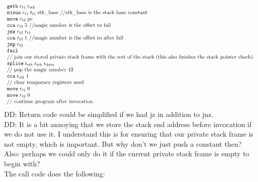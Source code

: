 \documentclass[a3paper]{article}
\newcommand\dominique[1]{{\color{purple} \sf \footnotesize {DD: #1}}\\}
\newcommand{\targetcolor}[1]{\color{black}}
\newcommand{\trg}[1]{{\targetcolor{} #1}}
\newcommand{\zinstr}[1]{\texttt{#1}}
\newcommand{\oneinstr}[2]{
  \ifthenelse{\equal{#2}{}}
  {\zinstr{#1}}
  {\zinstr{#1} \; #2}
}
\newcommand{\twoinstr}[3]{
  \ifthenelse{\equal{#2#3}{}}
  {\zinstr{#1}}
  {\zinstr{#1} \; #2 \; #3}
}
\newcommand{\threeinstr}[4]{
  \ifthenelse{\equal{#2#3#4}{}}
  {\zinstr{#1}}
  {\zinstr{#1} \; #2 \; #3 \; #4}
}
\newcommand{\tfail}{\zinstr{\trg{fail}}}
\newcommand{\tjmp}[1]{\oneinstr{\trg{jmp}}{#1}}
\newcommand{\tjnz}[2]{\twoinstr{\trg{jnz}}{#1}{#2}}
\newcommand{\tgetb}[2]{\twoinstr{\trg{getb}}{#1}{#2}}
\newcommand{\tmove}[2]{\twoinstr{\trg{move}}{#1}{#2}}
\newcommand{\tcca}[2]{\twoinstr{\trg{cca}}{#1}{#2}}
\newcommand{\tsplice}[3]{\threeinstr{\trg{splice}}{#1}{#2}{#3}}
\newcommand{\tminus}[3]{\threeinstr{\trg{minus}}{#1}{#2}{#3}}
\newcommand{\constant}[1]{\mathrm{#1}}
\newcommand{\stkb}{\constant{stk\_base}}
\newcommand{\pcreg}{\mathrm{pc}}
\newcommand{\rstk}{\mathrm{r}_\mathrm{stk}}
\newcommand{\rdata}{\mathrm{r}_\mathrm{data}}
\begin{document}
\[\begin{array}{l}
    \tgetb{r_{t1}}{\rstk}\\
    \tminus{r_{t1}}{t_{t1}}{\stkb} \text{ //$\stkb$ is the stack base constant} \\
    \tmove{r_{t2}}{\pcreg}\\
    \tcca{r_{t2}}{5} \text{ //magic number is the offset to fail} \\
    \tjnz{r_{t2}}{r_{t1}} \\
    \tcca{r_{t2}}{1} \text{ //magic number is the offset to after fail} \\
    \tjmp{r_{t2}} \\
    \tfail \\
    \text{// join our stored private stack frame with the rest of the stack (this also finishes the stack pointer check).}\\
    \tsplice{\rstk}{\rstk}{\rdata} \\
    \text{// pop the magic number 42}\\
    \tcca{\rstk}{1}\\
    \text{// clear temporary registers used}\\
    \tmove{r_{t1}}{0}\\
    \tmove{r_{t2}}{0}\\
    \text{// continue program after invocation.}
  \end{array}
\]
\dominique{Return code could be simplified if we had jz in addition to jnz.}
\dominique{It is a bit annoying that we store the stack end address before invocation if we do not use it.
  I understand this is for ensuring that our private stack frame is not empty, which is important.
  But why don't we just push a constant then?
  Also: perhaps we could only do it if the current private stack frame is empty to begin with?
}
The call code does the following:
\end{document}
